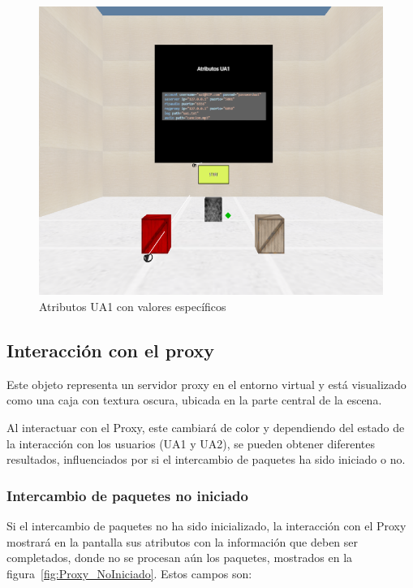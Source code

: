\documentclass[a4paper, 12pt]{book}
\begin{document}
\begin{figure}
  \centering
  \includegraphics[width=15cm, keepaspectratio]{img/resultados/UA1_Iniciado.png}
  \caption{Atributos UA1 con valores específicos}
  \label{fig:UA1_Iniciado}
\end{figure}


\subsection{Interacción con el proxy}
\label{subsec:objeto_proxy}

Este objeto representa un servidor proxy en el entorno virtual y está visualizado como una caja con textura oscura,
ubicada en la parte central de la escena.

Al interactuar con el Proxy, este cambiará de color y dependiendo del estado de la interacción con los usuarios (UA1 y UA2), 
se pueden obtener diferentes resultados, influenciados por si el intercambio de paquetes ha sido iniciado o no.

\subsubsection{Intercambio de paquetes no iniciado}
\label{subsubsec:Proxy_Intercambio_NoIniciado}
Si el intercambio de paquetes no ha sido inicializado, la interacción con el Proxy mostrará en la pantalla sus atributos 
con la información que deben ser completados, donde no se procesan aún los paquetes, mostrados en la figura~\ref{fig:Proxy_NoIniciado}. Estos campos son:
\end{document}
